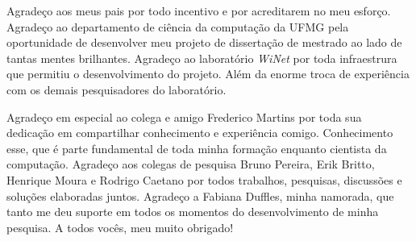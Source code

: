 Agradeço aos meus pais por todo incentivo e por acreditarem no meu esforço.
Agradeço ao departamento de ciência da computação da UFMG pela oportunidade de
desenvolver meu projeto de dissertação de mestrado ao lado de tantas mentes
brilhantes.
Agradeço ao laboratório \emph{WiNet} por toda infraestrura que permitiu o
desenvolvimento do projeto.
Além da enorme troca de experiência com os demais pesquisadores do laboratório.

Agradeço em especial ao colega e amigo Frederico Martins por toda sua dedicação
em compartilhar conhecimento e experiência comigo.
Conhecimento esse, que é parte fundamental de toda minha formação enquanto
cientista da computação.
Agradeço aos colegas de pesquisa Bruno Pereira, Erik Britto, Henrique Moura e
Rodrigo Caetano por todos trabalhos, pesquisas, discussões e soluções
elaboradas juntos.
Agradeço a Fabiana Duffles, minha namorada, que tanto me deu suporte em todos
os momentos do desenvolvimento de minha pesquisa.
A todos vocês, meu muito obrigado!
